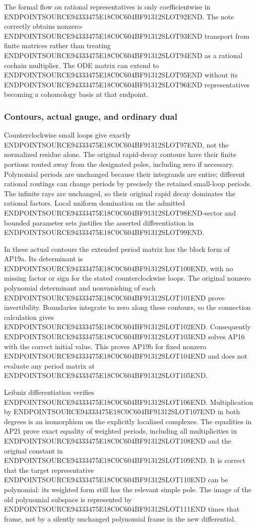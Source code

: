 The formal flow on rational representatives is only coefficientwise in ENDPOINTSOURCE94333475E18C0C604BF91312SLOT92END. The note correctly obtains nonzero-ENDPOINTSOURCE94333475E18C0C604BF91312SLOT93END transport from finite matrices rather than treating ENDPOINTSOURCE94333475E18C0C604BF91312SLOT94END as a rational cochain multiplier. The ODE matrix can extend to ENDPOINTSOURCE94333475E18C0C604BF91312SLOT95END without its ENDPOINTSOURCE94333475E18C0C604BF91312SLOT96END representatives becoming a cohomology basis at that endpoint.

\subsubsection{Contours, actual gauge, and ordinary dual}\label{endpoint-analytic_pole_review--contours-actual-gauge-and-ordinary-dual}

Counterclockwise small loops give exactly ENDPOINTSOURCE94333475E18C0C604BF91312SLOT97END, not the normalized residue alone. The original rapid-decay contours have their finite portions routed away from the designated poles, including zero if necessary. Polynomial periods are unchanged because their integrands are entire; different rational routings can change periods by precisely the retained small-loop periods. The infinite rays are unchanged, so their original rapid decay dominates the rational factors. Local uniform domination on the admitted ENDPOINTSOURCE94333475E18C0C604BF91312SLOT98END-sector and bounded parameter sets justifies the asserted differentiation in ENDPOINTSOURCE94333475E18C0C604BF91312SLOT99END.

In these actual contours the extended period matrix has the block form of AP19a. Its determinant is ENDPOINTSOURCE94333475E18C0C604BF91312SLOT100END, with no missing factor or sign for the stated counterclockwise loops. The original nonzero polynomial determinant and nonvanishing of each ENDPOINTSOURCE94333475E18C0C604BF91312SLOT101END prove invertibility. Boundaries integrate to zero along these contours, so the connection calculation gives ENDPOINTSOURCE94333475E18C0C604BF91312SLOT102END. Consequently ENDPOINTSOURCE94333475E18C0C604BF91312SLOT103END solves AP16 with the correct initial value. This proves AP19b for fixed nonzero ENDPOINTSOURCE94333475E18C0C604BF91312SLOT104END and does not evaluate any period matrix at ENDPOINTSOURCE94333475E18C0C604BF91312SLOT105END.

Leibniz differentiation verifies ENDPOINTSOURCE94333475E18C0C604BF91312SLOT106END. Multiplication by ENDPOINTSOURCE94333475E18C0C604BF91312SLOT107END in both degrees is an isomorphism on the explicitly localized complexes. The equalities in AP21 prove exact equality of weighted periods, including all multiplicities in ENDPOINTSOURCE94333475E18C0C604BF91312SLOT108END and the original constant in ENDPOINTSOURCE94333475E18C0C604BF91312SLOT109END. It is correct that the target representative ENDPOINTSOURCE94333475E18C0C604BF91312SLOT110END can be polynomial: its weighted form still has the relevant simple pole. The image of the old polynomial subspace is represented by ENDPOINTSOURCE94333475E18C0C604BF91312SLOT111END times that frame, not by a silently unchanged polynomial frame in the new differential.

